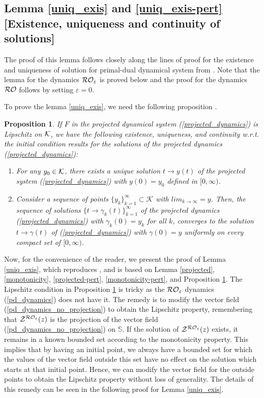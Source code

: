 \documentclass[journal,twoside,web]{ieeecolor}
\newtheorem{proposition}[theorem]{Proposition}
\begin{document}
\subsection{Lemma \ref{uniq_exis} and \ref{uniq_exis-pert} [Existence, uniqueness and continuity of solutions]}

The proof of this lemma follows closely along the lines of proof for the existence and uniqueness of solution for primal-dual dynamical system from \cite[Lemma~4.3]{cherukuri2016}. Note that the lemma for the dynamics ${\cal RO}_\varepsilon$ is proved below and the proof for the dynamics ${\cal RO}$ follows by setting $\varepsilon=0$.

To prove the lemma \ref{uniq_exis}, we need the following proposition \cite[Theorem~2.5]{nagurney1996}.
\begin{proposition} \label{proposition_projected}
If $F$ in the projected dynamical system (\ref{projected_dynamics}) is Lipschitz on ${\cal K}$, we have the following existence, uniqueness, and continuity w.r.t. the initial condition results for the solutions of the projected dynamics (\ref{projected_dynamics}):
\begin{enumerate}
\item For any $y_{0} \in {\cal K}$, there exists a unique solution $t \rightarrow y(t)$ of the projected system (\ref{projected_dynamics}) with $y(0)=y_{0}$ defined in $[0,\infty)$.
\item Consider a sequence of points $\{y_{k}\}_{k=1}^\infty \subset {\mathcal K}$ with $lim_{k \rightarrow \infty}=y$. Then, the sequence of solutions $\{t \rightarrow \gamma_k(t)\}_{k=1}^\infty$ of the projected dynamics (\ref{projected_dynamics}) with $\gamma_k(0)=y_k$ for all $k$, converges to the solution $t \rightarrow \gamma(t)$ of (\ref{projected_dynamics}) with $\gamma(0)=y$ uniformly on every compact set of $[0,\infty)$.
\end{enumerate}
\end{proposition}

Now, for the convenience of the reader, we present the proof of Lemma \ref{uniq_exis}, which reproduces \cite[Lemma~4.3]{cherukuri2016}, and is based on Lemma \ref{projected}, \ref{monotonicity}, \ref{projected-pert}, \ref{monotonicity-pert}, and Proposition \ref{proposition_projected}. The Lipschitz condition in Proposition \ref{proposition_projected} is tricky as the ${\cal RO}_\varepsilon$ dynamics (\ref{pd_dynamics}) does not have it. The remedy is to modify the vector field (\ref{pd_dynamics_no_projection}) to obtain the Lipschitz property, remembering that ${\cal Z}^{{\cal RO}_\varepsilon}(z)$ is the projection of the vector field (\ref{pd_dynamics_no_projection}) on ${\mathbb S}$. If the solution of ${\cal Z}^{{\cal RO}_\varepsilon}(z)$ exists, it remains in a known bounded set according to the monotonicity property. This implies that by having an initial point, we always have a bounded set for which the values of the vector field outside this set have no effect on the solution which starts at that initial point. Hence, we can modify the vector field for the outside points to obtain the Lipschitz property without loss of generality. The details of this remedy can be seen in the following proof for Lemma \ref{uniq_exis}.
\end{document}
